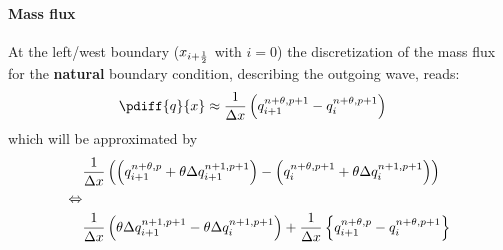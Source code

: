 \paragraph*{Mass flux}
At the left/west boundary ($x_{i+\frac{1}{2}}$ with $i=0$) the discretization of the mass flux for the \textbf{natural} boundary condition, describing the outgoing wave, reads:
\begin{align}
    \pdiff{q}{x} & \approx \frac{1}{\Dx} \left(  q^{n+\theta, p+1}_{i+1} - q^{n+\theta, p+1}_{i} \right)
\end{align}
which will be approximated by
\begin{align}
&\frac{1}{\Delta x} \left( \left( q^{n+\theta, p}_{i+1} + \theta \Delta q^{n+1, p+1}_{i+1}\right)
- \left( q^{n+\theta, p+1}_{i} + \theta \Delta q^{n+1, p+1}_{i}\right) \right)
\\
\Leftrightarrow &
\nonumber \\
&\frac{1}{\Delta x} \left( \theta \Delta q^{n+1, p+1}_{i+1} - \theta \Delta q^{n+1, p+1}_{i}\right) +
\frac{1}{\Delta x} \left\{ q^{n+\theta, p}_{i+1} - q^{n+\theta, p+1}_{i} \right\}
\end{align}
